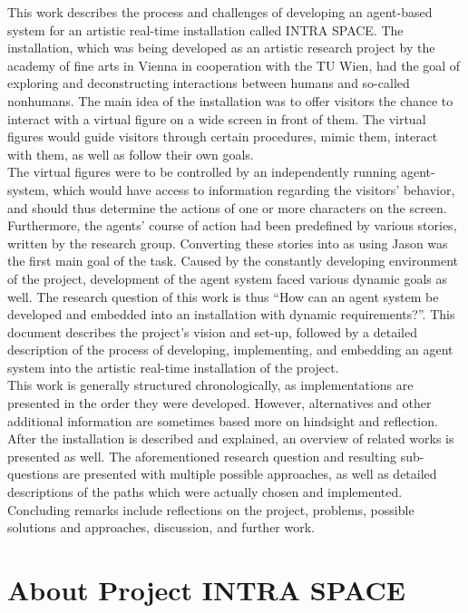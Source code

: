 \documentclass[draft,final]{vutinfth} %
\begin{document}
This work describes the process and challenges of developing an agent-based system for an artistic real-time installation called INTRA SPACE. 
The installation, which was being developed as an artistic research project by the academy of fine arts in Vienna in cooperation with the TU Wien, had the goal of exploring and deconstructing interactions between humans and so-called nonhumans. 
The main idea of the installation was to offer \glspl{visitor} the chance to interact with a virtual figure on a wide screen in front of them. 
The virtual figures would guide \glspl{visitor} through certain procedures, mimic them, interact with them, as well as follow their own goals. \\
The virtual figures were to be controlled by an independently running agent-system, which would have access to information regarding the \glspl{visitor}’ behavior, and should thus determine the actions of one or more characters on the screen. 
Furthermore, the agents’ course of action had been predefined by various stories, written by the research group. 
Converting these stories into \gls{as} using Jason was the first main goal of the task. Caused by the constantly developing environment of the project, development of the agent system faced various dynamic goals as well.
The research question of this work is thus “How can an agent system be developed and embedded into an installation with dynamic requirements?”. 
This document describes the project’s vision and set-up, followed by a detailed description of the process of developing, implementing, and embedding an agent system into the artistic real-time installation of the project. \\
This work is generally structured chronologically, as implementations are presented in the order they were developed. 
However, alternatives and other additional information are sometimes based more on hindsight and reflection. 
After the installation is described and explained, an overview of related works is presented as well. The aforementioned research question and resulting sub-questions are presented with multiple possible approaches, as well as detailed descriptions of the paths which were actually chosen and implemented. 
Concluding remarks include reflections on the project, problems, possible solutions and approaches, discussion, and further work.

\section{About Project INTRA SPACE}
\label{chap:about}
\end{document}
